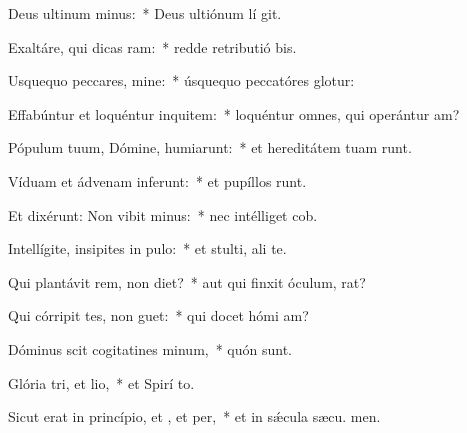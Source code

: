 \item Deus ultinum minus:~* Deus ultiónum lí git.
\item Exaltáre, qui dicas ram:~* redde retributió bis.
\item Usquequo peccares, mine:~* úsquequo peccatóres glotur:
\item Effabúntur et loquéntur inquitem:~* loquéntur omnes, qui operántur am?
\item Pópulum tuum, Dómine, humiarunt:~* et hereditátem tuam runt.
\item Víduam et ádvenam inferunt:~* et pupíllos runt.
\item Et dixérunt: Non vibit minus:~* nec intélliget  cob.
\item Intellígite, insipites in pulo:~* et stulti, ali te.
\item Qui plantávit rem, non diet?~* aut qui finxit óculum,  rat?
\item Qui córripit tes, non guet:~* qui docet hómi am?
\item Dóminus scit cogitatines minum,~* quón  sunt.
\item Glória tri, et lio,~* et Spirí to.
\item Sicut erat in princípio, et , et per,~* et in sǽcula sæcu. men.
